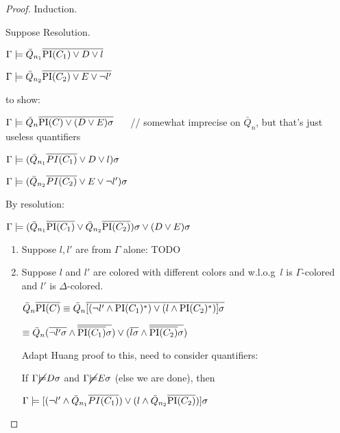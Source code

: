 \documentclass[,%
	paper=a4,%
	DIV14, 
	liststotoc,
	bibtotoc,
	draft=false,%
	numbers=noendperiod
]{scrartcl}
\begin{document}
\begin{proof}

	Induction.

Suppose Resolution.
	\begin{prooftree}
	\end{prooftree}

	$\Gamma \entails \bar Q_{n_1} \overline{\PI(C_1)  \lor D \lor l}$

	$\Gamma \entails \bar Q_{n_2} \overline{\PI(C_2)  \lor E \lor \lnot l'}$

	to show:

		$\Gamma \entails \bar Q_n \overline {\PI(C) \lor (D \lor E)\sigma}$ $\quad$ // somewhat imprecise on $\bar Q_n$, but that's just useless quantifiers


		$\Gamma \entails ( \bar Q_{n_1} \overline{PI(C_1)}  \lor D \lor l )\sigma$

			$\Gamma \entails (\bar Q_{n_2} \overline{PI(C_2)}  \lor E \lor \lnot l')\sigma$

			By resolution:

			$\Gamma \entails (\bar Q_{n_1} \overline{\PI(C_1)}\lor \bar Q_{n_2} \overline{\PI(C_2)})\sigma  \lor (D \lor E )\sigma$


			\begin{enumerate}
					\item Suppose $l, l'$ are from $\Gamma$ alone:
						TODO


					\item Suppose $l$ and $l'$ are colored with different colors and w.l.o.g~$l$ is $\Gamma$-colored and $l'$ is $\Delta$-colored.

						$\bar Q_n \overline{\PI(C)} \equiv \bar Q_n  \overline{[ (\lnot l' \land \PI(C_1)^*) \lor (l \land \PI(C_2)^*) ] \sigma}$

						$\equiv \bar Q_n  (\overline{\lnot l'\sigma} \land \overline{\overline{\PI(C_1)}\sigma}) \lor (\overline{l\sigma} \land \overline{\overline{\PI(C_2)}\sigma})$

						Adapt Huang proof to this, need to consider quantifiers:

						If $\Gamma \cancel \entails D \sigma$ and 
						$\Gamma \cancel \entails E \sigma$ (else we are done), then  

						$\Gamma \entails [ (\lnot l' \land \bar Q_{n_1} \overline{PI(C_1)}) \lor (l \land \bar Q_{n_2} \overline{\PI(C_2)}) ] \sigma$


\end{enumerate}
\end{proof}
\end{document}
